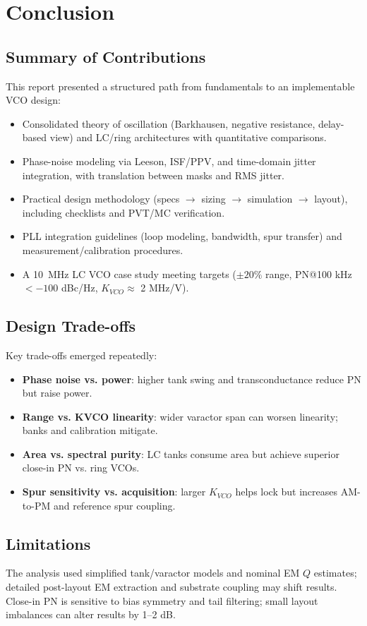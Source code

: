 \chapter{Conclusion}
\section{Summary of Contributions}
This report presented a structured path from fundamentals to an implementable VCO design:
\begin{itemize}
  \item Consolidated theory of oscillation (Barkhausen, negative resistance, delay-based view) and LC/ring architectures with quantitative comparisons.
  \item Phase-noise modeling via Leeson, ISF/PPV, and time-domain jitter integration, with translation between masks and RMS jitter.
  \item Practical design methodology (specs $\to$ sizing $\to$ simulation $\to$ layout), including checklists and PVT/MC verification.
  \item PLL integration guidelines (loop modeling, bandwidth, spur transfer) and measurement/calibration procedures.
  \item A \SI{10}{\mega\hertz} LC VCO case study meeting targets ($\pm20\%$ range, PN@100 kHz $< -100$ dBc/Hz, $K_{VCO}\approx$ 2 \si{\mega Hz/V}).
\end{itemize}

\section{Design Trade-offs}
Key trade-offs emerged repeatedly:
\begin{itemize}
  \item \textbf{Phase noise vs. power}: higher tank swing and transconductance reduce PN but raise power.
  \item \textbf{Range vs. KVCO linearity}: wider varactor span can worsen linearity; banks and calibration mitigate.
  \item \textbf{Area vs. spectral purity}: LC tanks consume area but achieve superior close-in PN vs. ring VCOs.
  \item \textbf{Spur sensitivity vs. acquisition}: larger $K_{VCO}$ helps lock but increases AM-to-PM and reference spur coupling.
\end{itemize}

\section{Limitations}
The analysis used simplified tank/varactor models and nominal EM $Q$ estimates; detailed post-layout EM extraction and substrate coupling may shift results. Close-in PN is sensitive to bias symmetry and tail filtering; small layout imbalances can alter results by 1--2 dB.

